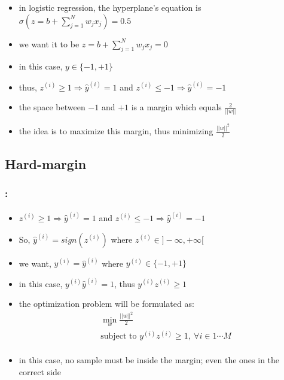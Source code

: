 \documentclass[xcolor=table]{beamer}
\begin{document}
\begin{frame}
	\frametitle{\insertshortsubtitle}
	\framesubtitle{\insertsection}
	
	\begin{minipage}{0.75\textwidth} 
		\begin{itemize}
			\item in logistic regression, the hyperplane's equation is $ \sigma(z = b + \sum_{j=1}^{N} w_j x_j) = 0.5 $
			\item we want it to be $ z = b + \sum_{j=1}^{N} w_j x_j = 0 $
			\item in this case, $ y \in \{-1, +1\} $
			\item thus, $ z^{(i)} \ge 1 \Rightarrow \hat{y}^{(i)} = 1 $ and $ z^{(i)} \le -1 \Rightarrow \hat{y}^{(i)} = -1 $
		\end{itemize}
	\end{minipage}
	\begin{minipage}{0.24\textwidth} 
	\end{minipage}
	
	\begin{itemize}
		\item the space between $ -1 $ and $ +1 $ is a margin which equals $ \frac{2}{||w||} $
		\item the idea is to maximize this margin, thus minimizing $ \frac{||w||^2}{2} $
	\end{itemize}
	
\end{frame}

\subsection{Hard-margin}


\begin{frame}
	\frametitle{\insertshortsubtitle: \insertsection}
	\framesubtitle{\insertsubsection}
	
	\begin{itemize}
		\item $ z^{(i)} \ge 1 \Rightarrow \hat{y}^{(i)} = 1 $ and $ z^{(i)} \le -1 \Rightarrow \hat{y}^{(i)} = -1 $
		\item So, $ \hat{y}^{(i)} = sign(z^{(i)}) $ where $ z^{(i)} \in ]-\infty, +\infty[ $
		\item we want, $ y^{(i)} =  \hat{y}^{(i)} $ where $ y^{(i)} \in \{-1, +1\} $ 
		\item in this case, $ y^{(i)} \hat{y}^{(i)} = 1 $, thus $ y^{(i)} z^{(i)} \ge 1 $
		\item the optimization problem will be formulated as:
		\begin{align*}
			& \min_w \frac{||w||^2}{2}  \\
			& \text{subject to } y^{(i)} z^{(i)} \ge 1,\ \forall i \in {1 \cdots M} \\
		\end{align*}
		
		\item in this case, no sample must be inside the margin; even the ones in the correct side
	\end{itemize}
	
\end{frame}
\end{document}
